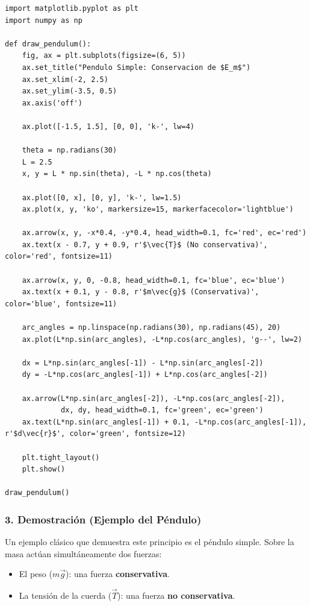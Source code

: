 \documentclass[12pt, a4paper]{article}
\begin{document}
\begin{lstlisting}
import matplotlib.pyplot as plt
import numpy as np

def draw_pendulum():
    fig, ax = plt.subplots(figsize=(6, 5))
    ax.set_title("Pendulo Simple: Conservacion de $E_m$")
    ax.set_xlim(-2, 2.5)
    ax.set_ylim(-3.5, 0.5)
    ax.axis('off')

    ax.plot([-1.5, 1.5], [0, 0], 'k-', lw=4)

    theta = np.radians(30)
    L = 2.5
    x, y = L * np.sin(theta), -L * np.cos(theta)
    
    ax.plot([0, x], [0, y], 'k-', lw=1.5)
    ax.plot(x, y, 'ko', markersize=15, markerfacecolor='lightblue')

    ax.arrow(x, y, -x*0.4, -y*0.4, head_width=0.1, fc='red', ec='red')
    ax.text(x - 0.7, y + 0.9, r'$\vec{T}$ (No conservativa)', color='red', fontsize=11)

    ax.arrow(x, y, 0, -0.8, head_width=0.1, fc='blue', ec='blue')
    ax.text(x + 0.1, y - 0.8, r'$m\vec{g}$ (Conservativa)', color='blue', fontsize=11)

    arc_angles = np.linspace(np.radians(30), np.radians(45), 20)
    ax.plot(L*np.sin(arc_angles), -L*np.cos(arc_angles), 'g--', lw=2)
    
    dx = L*np.sin(arc_angles[-1]) - L*np.sin(arc_angles[-2])
    dy = -L*np.cos(arc_angles[-1]) + L*np.cos(arc_angles[-2])
    
    ax.arrow(L*np.sin(arc_angles[-2]), -L*np.cos(arc_angles[-2]), 
             dx, dy, head_width=0.1, fc='green', ec='green')
    ax.text(L*np.sin(arc_angles[-1]) + 0.1, -L*np.cos(arc_angles[-1]), r'$d\vec{r}$', color='green', fontsize=12)

    plt.tight_layout()
    plt.show()

draw_pendulum()
\end{lstlisting}

\subsubsection*{3. Demostración (Ejemplo del Péndulo)}
Un ejemplo clásico que demuestra este principio es el péndulo simple. Sobre la masa actúan simultáneamente dos fuerzas:
\begin{itemize}
    \item El peso ($m\vec{g}$): una fuerza \textbf{conservativa}.
    \item La tensión de la cuerda ($\vec{T}$): una fuerza \textbf{no conservativa}.
\end{itemize}
\end{document}
